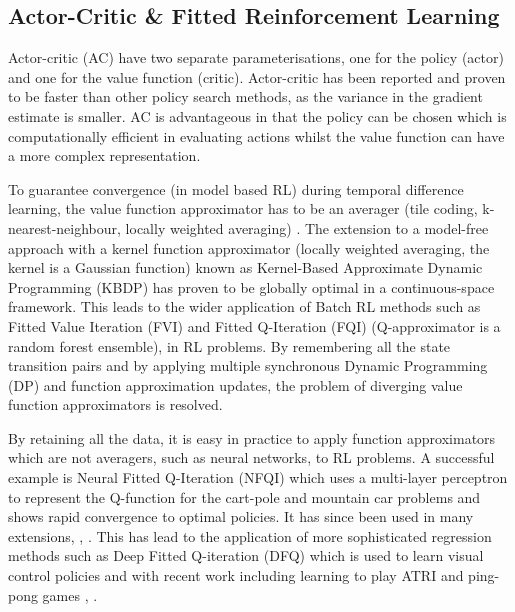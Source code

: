 \documentclass[final,5p,times,twocolumn]{elsarticle}
\begin{document}
\subsection{Actor-Critic \& Fitted Reinforcement Learning}

Actor-critic (AC) \cite[Chap. 6.6]{sutton1998reinforcement} have two separate parameterisations, one for the policy (actor) and
one for the value function (critic). Actor-critic has been reported and proven \cite{rl_ac_surv_2012} to be faster than other policy 
search methods, as the variance in the gradient estimate is smaller. AC is advantageous in that the policy can be chosen which 
is computationally efficient in evaluating actions whilst the value function can have a more complex representation.

To guarantee convergence (in model based RL) during temporal difference learning, 
the value function approximator has to be an averager (tile coding, k-nearest-neighbour, locally weighted averaging) 
\cite{stable_FA_gordon_1995}. The extension to a model-free approach with a kernel function approximator 
(locally weighted averaging, the kernel is a Gaussian function) known as Kernel-Based Approximate Dynamic Programming (KBDP) \cite{kernel_rl_ormoneit_2002}
has proven to be globally optimal in a continuous-space framework. This leads to the wider application of Batch RL methods 
such as Fitted Value Iteration (FVI) \cite{fvi_uav_2010} and Fitted Q-Iteration (FQI) \cite{EGW05} (Q-approximator is a random forest ensemble),
\cite{fqi_nips_peter_2009} in RL problems. By remembering all the state transition pairs and by applying multiple 
synchronous Dynamic Programming (DP) and function approximation updates, the problem of diverging value function approximators is resolved. 

By retaining all the data, it is easy in practice to apply function approximators which are not averagers, such as neural networks,
to RL problems. A successful example is Neural Fitted Q-Iteration (NFQI) \cite{Riedmiller2005} which 
uses a multi-layer perceptron to represent the Q-function for the cart-pole and mountain car problems and 
shows rapid convergence to optimal policies. It has since been used in many extensions, \cite{NAC_2008}, \cite{rl_gmm_2010}.
This has lead to the application of more sophisticated regression methods such as 
Deep Fitted Q-iteration (DFQ) \cite{Lange_riedmiller_2010} which is used to learn visual control policies
and with recent work including learning to play ATRI and ping-pong games \cite{mnih-dqn-2015}, \cite{DRQ_AAAI_2015}. 
\end{document}
